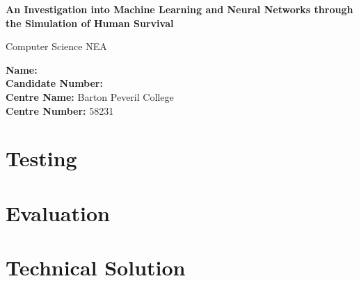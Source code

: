 \documentclass{article}
\begin{document}
\begin{titlepage}
    \begin{center}
        \vspace{1cm}
        \Huge
        
        \textbf{An Investigation into Machine Learning and Neural Networks through the Simulation of Human Survival}
        
        \vspace{1cm}
        \Large
        Computer Science NEA
        
        \vfill
        
        \large
        \textbf{Name:} \\
        \textbf{Candidate Number:} \\
        
        \textbf{Centre Name:} Barton Peveril College\\
        \textbf{Centre Number:} 58231\\
        \pagebreak
    \end{center}
\end{titlepage}

\setcounter{tocdepth}{5}
\tableofcontents





\section{Testing}


\section{Evaluation}


%

\section{Technical Solution}

\end{document}
